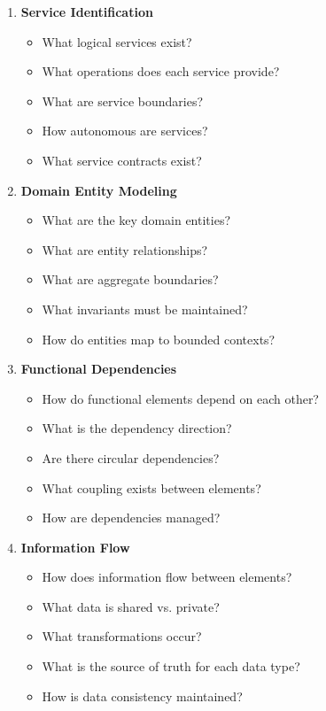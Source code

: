 \documentclass[11pt,letterpaper]{article}
\begin{document}
\begin{enumerate}[label=\textbf{C\arabic*:}, leftmargin=2.5em]
    \item \textbf{Service Identification}
    \begin{itemize}[nosep]
        \item What logical services exist?
        \item What operations does each service provide?
        \item What are service boundaries?
        \item How autonomous are services?
        \item What service contracts exist?
    \end{itemize}
    
    \item \textbf{Domain Entity Modeling}
    \begin{itemize}[nosep]
        \item What are the key domain entities?
        \item What are entity relationships?
        \item What are aggregate boundaries?
        \item What invariants must be maintained?
        \item How do entities map to bounded contexts?
    \end{itemize}
    
    \item \textbf{Functional Dependencies}
    \begin{itemize}[nosep]
        \item How do functional elements depend on each other?
        \item What is the dependency direction?
        \item Are there circular dependencies?
        \item What coupling exists between elements?
        \item How are dependencies managed?
    \end{itemize}
    
    \item \textbf{Information Flow}
    \begin{itemize}[nosep]
        \item How does information flow between elements?
        \item What data is shared vs. private?
        \item What transformations occur?
        \item What is the source of truth for each data type?
        \item How is data consistency maintained?
    \end{itemize}
    

\end{enumerate}
\end{document}
